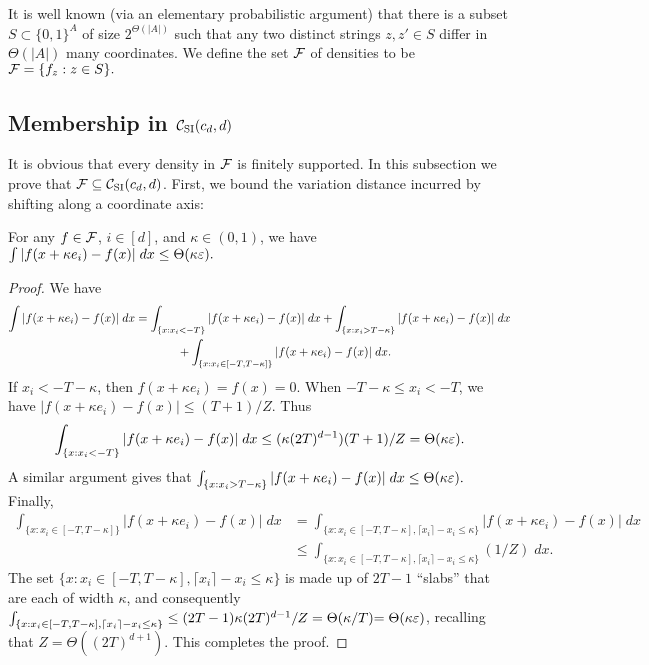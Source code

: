 It is well known (via an elementary probabilistic argument) that there is a subset $S \subset \{0,1\}^A$ of size $2^{\Theta(|A|)}$ such that any two distinct strings $z,z' \in S$ differ in $\Theta(|A|)$ many coordinates.  We define the set ${\cal F}$ of densities to be ${\cal F} = \{f_z: z \in S\}.$


\subsection{Membership in ${\cal C}_{\mathrm{SI}}(c_d,d)$}

It is obvious that every density in ${\cal F}$ is finitely supported. In this subsection we prove that ${\cal F} \subseteq {\cal C}_{\mathrm{SI}}(c_d,d)$.  
First, we bound the variation distance incurred by shifting along a coordinate axis:
\begin{lemma}
\label{l:coord.shift}
For any $f \in {\cal F}$, $i \in [d]$, and $\kappa \in (0,1)$, we have
$
\int | f(x + \kappa e_i) - f(x) | \;dx \leq \Theta(\kappa \varepsilon).
$
\end{lemma}
\begin{proof}
We have
\begin{align*}
\int | f(x + \kappa e_i) - f(x) | \;dx  
& = \int_{\{ x: x_i < -T \}} | f(x + \kappa e_i) - f(x) | \;dx   
 + \int_{\{ x: x_i > T-\kappa \}} | f(x + \kappa e_i) - f(x) | \;dx   \\
& \hspace{0.5in} + \int_{\{ x: x_i \in [-T, T-\kappa]\}} | f(x + \kappa e_i) - f(x) | \;dx.
\end{align*}
If $x_i < -T-\kappa$, then $f(x + \kappa e_i) = f(x) = 0$.  When
${-T-\kappa  \leq x_i  < -T}$, we have $| f(x + \kappa e_i) - f(x) | \leq (T+1)/Z$.  Thus
\[
\int_{\{ x: x_i < -T \}} | f(x + \kappa e_i) - f(x) | \;dx  \leq (\kappa (2T)^{d-1}) (T+1)/Z = {\Theta(\kappa \varepsilon)}.
\]
A similar argument gives that
$
\int_{\{ x: x_i > T-\kappa \}} | f(x + \kappa e_i) - f(x) | \;dx \leq \Theta(\kappa \varepsilon).$
Finally,
\begin{align*} \int_{\{ x: x_i \in [-T, T-\kappa]\}} | f(x + \kappa e_i) - f(x) | \;dx 
& = \int_{\{ x: x_i \in [-T, T-\kappa], \lceil x_i \rceil - x_i \leq \kappa\}} | f(x + \kappa e_i) - f(x) | \;dx \\
& \leq \int_{\{ x: x_i \in [-T, T-\kappa], \lceil x_i \rceil - x_i \leq \kappa\}} (1/Z) \;dx.
\end{align*}
The set $\{ x: x_i \in [-T, T-\kappa], \lceil x_i \rceil - x_i \leq \kappa\}$ is made up of $2T-1$ ``slabs'' that are each of width $\kappa$, and consequently
$\int_{\{ x: x_i \in [-T, T-\kappa], \lceil x_i \rceil - x_i \leq \kappa\}} \leq (2 T - 1) \kappa (2T)^{d-1}/Z = \Theta(\kappa/T)
{=\Theta(\kappa \varepsilon)}$,
recalling that $Z = \Theta((2T)^{d+1})$.  This completes the proof.
\end{proof} 

